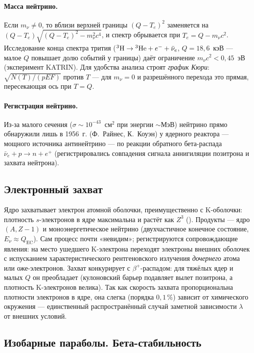 \paragraph{Масса нейтрино.} Если $m_\nu\neq0$, то вблизи верхней границы $(Q-T_e)^2$ заменяется на $(Q-T_e)\sqrt{(Q-T_e)^2-m_\nu^2c^4}$, и
спектр обрывается при $T_e=Q-m_\nu c^2$. Исследование конца спектра трития ($\nucl{H}{3}\to\nucl{He}{3}+e^-+\bar\nu_e$, $Q=18{,}6$~кэВ —
малое $Q$ повышает долю событий у границы) даёт ограничение $m_\nu c^2<0{,}45$~эВ (эксперимент KATRIN). Для удобства анализа
строят \emph{график Кюри}: $\sqrt{N(T)/(pEF)}$ против $T$ — для $m_\nu=0$ и разрешённого перехода это прямая, пересекающая ось при $T=Q$.

\paragraph{Регистрация нейтрино.} Из-за малого сечения ($\sigma\sim10^{-43}$~см$^2$ при энергии $\sim$МэВ) нейтрино прямо
обнаружили лишь в 1956~г. (Ф.~Райнес, К.~Коуэн) у ядерного реактора — мощного источника антинейтрино — по реакции обратного
бета-распада $\bar\nu_e+p\to n+e^+$ (регистрировались совпадения сигнала аннигиляции позитрона и захвата нейтрона).

\subsection{Электронный захват}

Ядро захватывает электрон атомной оболочки, преимущественно с K-оболочки: плотность $s$-электронов в ядре максимальна
и растёт как $Z^3$ (). Продукты — ядро $(A,Z-1)$ и моноэнергетическое нейтрино (двухчастичное конечное состояние,
$E_\nu\approx Q_{\text{EC}}$). Сам процесс почти «невидим»; регистрируются сопровождающие явления: на место ушедшего K-электрона
переходят электроны внешних оболочек с испусканием характеристического рентгеновского излучения \emph{дочернего} атома или
оже-электронов. Захват конкурирует с $\beta^+$-распадом: для тяжёлых ядер и малых $Q$ он преобладает (кулоновский барьер
подавляет вылет позитрона, а плотность K-электронов велика). Так как скорость захвата пропорциональна плотности электронов
в ядре, она слегка (порядка $0{,}1\,\%$) зависит от химического окружения — единственный распространённый случай заметной
зависимости $\lambda$ от внешних условий.

\subsection{Изобарные параболы. Бета-стабильность}

